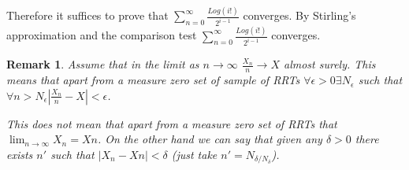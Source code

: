 \documentclass[oneside]{book} %
\newtheorem{remk}{Remark}
\theoremstyle{definition}
\numberwithin{equation}{section}
\begin{document}
Therefore it suffices to prove that $\sum_{n=0}^{\infty}\frac{Log(i!)}{2^{i -1}}$ converges.  By Stirling's approximation and the comparison test $\sum_{n=0}^{\infty}\frac{Log(i!)}{2^{i -1}}$ converges. 



\begin{remk}
 Assume that in the limit as $ n \rightarrow \infty$ $\frac{X_n}{n} \rightarrow X$ almost surely.  This means that apart from a measure zero set of sample of RRTs $\forall \epsilon>0 \exists N_{\epsilon}$ such that $\forall n >N_{\epsilon} |\frac{X_n}{n} - X| < \epsilon$.
 
 This does \emph{not} mean that apart from a measure zero set of RRTs that $\lim_{n \rightarrow \infty} X_n = Xn$. On the other hand we can say that given any $\delta >0$ there exists $n'$ such that $|X_n - Xn| < \delta$  (just take $n' = N_{\delta/N_\delta}$).
 
 
\end{remk}


\end{document}
